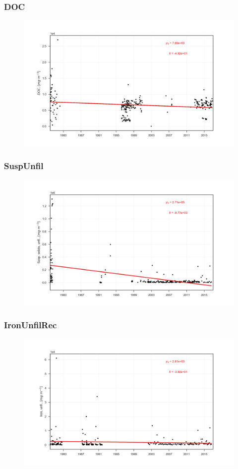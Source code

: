 \documentclass{beamer}
\begin{document}
\begin{frame}
\frametitle{DOC}
\begin{figure}
\includegraphics[width=\textwidth]{rivers/all/all_years/DOC.png}
\end{figure}
\end{frame}

\begin{frame}
\frametitle{SuspUnfil}
\begin{figure}
\includegraphics[width=\textwidth]{rivers/all/all_years/SuspUnfil.png}
\end{figure}
\end{frame}

\begin{frame}
\frametitle{IronUnfilRec}
\begin{figure}
\includegraphics[width=\textwidth]{rivers/all/all_years/IronUnfilRec.png}
\end{figure}
\end{frame}
\end{document}

